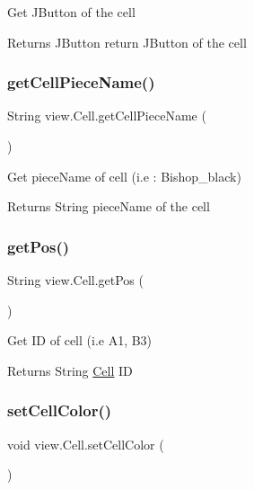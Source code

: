Get J\+Button of the cell

\begin{DoxyReturn}{Returns}
J\+Button return J\+Button of the cell 
\end{DoxyReturn}
\mbox{\label{classview_1_1_cell_aa4164745bbe6060548db4a791d8e02a1}} 
\subsubsection{\texorpdfstring{getCellPieceName()}{getCellPieceName()}}
{\footnotesize\ttfamily String view.\+Cell.\+get\+Cell\+Piece\+Name (\begin{DoxyParamCaption}{ }\end{DoxyParamCaption})\hspace{0.3cm}{\ttfamily [inline]}}

Get piece\+Name of cell (i.\+e \+: Bishop\+\_\+black)

\begin{DoxyReturn}{Returns}
String piece\+Name of the cell 
\end{DoxyReturn}
\mbox{\label{classview_1_1_cell_ac29606b6983a42d33b53cc50d999a7d8}} 
\subsubsection{\texorpdfstring{getPos()}{getPos()}}
{\footnotesize\ttfamily String view.\+Cell.\+get\+Pos (\begin{DoxyParamCaption}{ }\end{DoxyParamCaption})\hspace{0.3cm}{\ttfamily [inline]}}

Get ID of cell (i.\+e A1, B3)

\begin{DoxyReturn}{Returns}
String \mbox{\hyperlink{classview_1_1_cell}{Cell}} ID 
\end{DoxyReturn}
\mbox{\label{classview_1_1_cell_add1bd5d5569cc0c48cb317629ec3fa37}} 
\subsubsection{\texorpdfstring{setCellColor()}{setCellColor()}}
{\footnotesize\ttfamily void view.\+Cell.\+set\+Cell\+Color (\begin{DoxyParamCaption}{ }\end{DoxyParamCaption})\hspace{0.3cm}{\ttfamily [inline]}}

